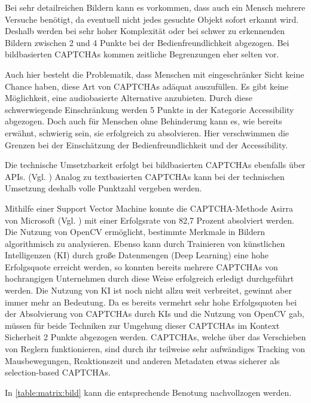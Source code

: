 Bei sehr detailreichen Bildern kann es vorkommen, dass auch ein Mensch mehrere Versuche benötigt, da eventuell nicht jedes gesuchte Objekt sofort erkannt wird.
Deshalb werden bei sehr hoher Komplexität oder bei schwer zu erkennenden Bildern zwischen 2 und 4 Punkte bei der Bedienfreundlichkeit abgezogen.
Bei bildbasierten CAPTCHAs kommen zeitliche Begrenzungen eher selten vor. 

Auch hier besteht die Problematik, dass Menschen mit eingeschränker Sicht keine Chance haben, diese Art von CAPTCHAs adäquat auszufüllen.
Es gibt keine Möglichkeit, eine audiobasierte Alternative anzubieten. Durch diese schwerwiegende Einschränkung werden 5 Punkte in der Kategorie Accessibility abgezogen.
Doch auch für Menschen ohne Behinderung kann es, wie bereits erwähnt, schwierig sein, sie erfolgreich zu absolvieren.
Hier verschwimmen die Grenzen bei der Einschätzung der Bedienfreundlichkeit und der Accessibility.

Die technische Umsetzbarkeit erfolgt bei bildbasierten CAPTCHAs ebenfalls über APIs. (Vgl. \cite{hcaptcha} \cite{arkoselabs} \cite{geetest})
Analog zu textbasierten CAPTCHAs kann bei der technischen Umsetzung deshalb volle Punktzahl vergeben werden.

Mithilfe einer Support Vector Machine konnte die CAPTCHA-Methode Asirra von Microsoft (Vgl. \cite{elson2007asirra})
mit einer Erfolgsrate von 82,7 Prozent absolviert werden. 
Die Nutzung von OpenCV ermöglicht, bestimmte Merkmale in Bildern algorithmisch zu analysieren.
Ebenso kann durch Trainieren von künstlichen Intelligenzen (KI) durch große Datenmengen (Deep Learning) eine hohe Erfolgsquote erreicht werden,
so konnten bereits mehrere CAPTCHAs von hochrangigen Unternehmen durch diese Weise erfolgreich erledigt durchgeführt werden.
Die Nutzung von KI ist noch nicht allzu weit verbreitet, gewinnt aber immer mehr an Bedeutung.
Da es bereits vermehrt sehr hohe Erfolgsquoten bei der Absolvierung von CAPTCHAs durch KIs und die Nutzung von OpenCV gab,
müssen für beide Techniken zur Umgehung dieser CAPTCHAs im Kontext Sicherheit 2 Punkte abgezogen werden.
CAPTCHAs, welche über das Verschieben von Reglern funktionieren, sind durch ihr teilweise sehr aufwändiges Tracking von Mausbewegungen,
Reaktionszeit und anderen Metadaten etwas sicherer als selection-based CAPTCHAs. \cite[p.77f]{surveyofresearch}

In \autoref{table:matrix:bild} kann die entsprechende Benotung nachvollzogen werden.

